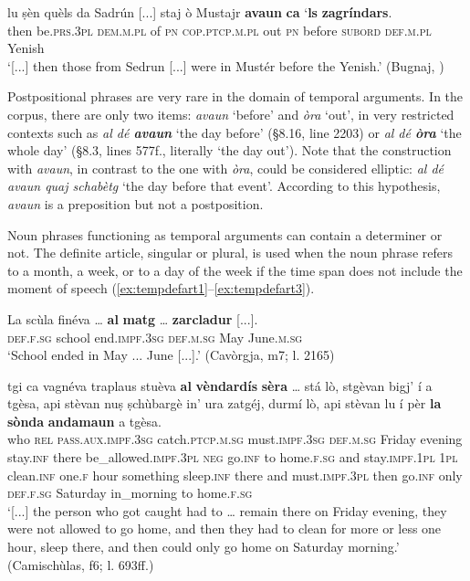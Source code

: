 \ea
\label{ex:avaunca1}
\gll [...] lu ṣèn quèls da Sadrún [...] staj ò Mustajr \textbf{avaun} \textbf{ca} `\textbf{ls} \textbf{zagríndars}.\\
{} then be.\textsc{prs.3pl} \textsc{dem.m.pl} of \textsc{pn} {} \textsc{cop.ptcp.m.pl} out \textsc{pn} before \textsc{subord} \textsc{def.m.pl} Yenish\\
\glt `[...] then those from Sedrun [...] were in Mustér before the Yenish.' (Bugnaj, \citealt[132]{Büchli1966})
\z

Postpositional phrases are very rare in the domain of temporal arguments. In the corpus, there are only two items: \textit{avaun} `before' and \textit{òra} `out', in very restricted contexts such as \textit{al dé \textbf{avaun}} `the day before' (§8.16, line 2203) or \textit{al dé \textbf{òra}} `the whole day' (§8.3, lines 577f., literally `the day out'). Note that the construction with \textit{avaun}, in contrast to the one with \textit{òra}, could be considered elliptic: \textit{al dé avaun quaj schabètg} `the day before that event'. According to this hypothesis, \textit{avaun} is a preposition but not a postposition.

Noun phrases functioning as temporal arguments can contain a determiner or not. The definite article, singular or plural, is used when the noun phrase refers to a month, a week, or to a day of the week if the time span does not include the moment of speech (\ref{ex:tempdefart1}--\ref{ex:tempdefart3}).

\ea
\label{ex:tempdefart1}
\gll  La scùla finéva … \textbf{al} \textbf{matg} … \textbf{zarcladur} [...].  \\
\textsc{def.f.sg} school end.\textsc{impf.3sg} {} \textsc{def.m.sg} May {} June.\textsc{m.sg}\\
\glt `School ended in May ... June [...].' (Cavòrgja, m7; l. 2165)
\z

\ea
\label{ex:tempdefart2}
\gll    [...] tgi ca vagnéva traplaus stuèva \textbf{al} \textbf{vèndardís} \textbf{sèra} … stá lò, stgèvan bigj’ í a tgèsa, api stèvan nuṣ ṣchùbargè in’ ura zatgéj, durmí lò, api stèvan lu í pèr \textbf{la} \textbf{sònda} \textbf{andamaun} a tgèsa.\\
{} who \textsc{rel} \textsc{pass.aux.impf.3sg} catch.\textsc{ptcp.m.sg} must.\textsc{impf.3sg} \textsc{def.m.sg} Friday evening {} stay.\textsc{inf} there be\_allowed.\textsc{impf.3pl} \textsc{neg} go.\textsc{inf} to home.\textsc{f.sg} and stay.\textsc{impf.1pl} \textsc{1pl} clean.\textsc{inf} one.\textsc{f} hour something sleep.\textsc{inf} there and must.\textsc{impf.3pl} then go.\textsc{inf} only \textsc{def.f.sg} Saturday in\_morning to home.\textsc{f.sg}\\
\glt `[...] the person who got caught had to … remain there on Friday evening, they were not allowed to go home, and then they had to clean for more or less one hour, sleep there, and then could only go home on Saturday morning.' (Camischùlas, f6; l. 693ff.)
\z

